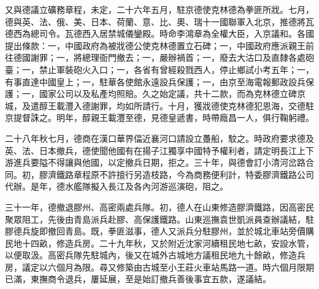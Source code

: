 \begin{pinyinscope}
又與德議立礦務章程，未定，二十六年五月，駐京德使克林德為拳匪所戕。七月，德與英、法、俄、美、日本、荷蘭、意、比、奧、瑞十一國聯軍入北京，推德將瓦德西為總司令。瓦德西入居禁城儀鑾殿。時命李鴻章為全權大臣，入京議和。各國提出條款：一，中國政府為被戕德公使克林德置立石碑；一，中國政府應派親王前往德國謝罪；一，將總理衙門撤去；一，嚴辦禍首；一，廢去大沽口及直隸各處砲臺；一，禁止軍裝砲火入口；一，各省有曾經殺戮西人，停止鄉試小考五年；一，有事直達中國皇上；一，駐華各使館永遠設兵保護；一，由京至海電報郵政設兵保護；一，國家公司以及私產均照賠。久之始定議，共十二款，而為克林德立碑京城，及遣醇王載灃入德謝罪，均如所請行。十月，獲戕德使克林德犯恩海，交德駐京提督誅之。明年，醇親王載灃至德，見德皇遞書，時帶廕昌一人，俱行鞠躬禮。

二十八年秋七月，德商在漢口華界偪近襄河口請設立躉船，駮之。時政府要求德及英、法、日本撤兵，德使聞他國有在揚子江獨享中國特予權利者，請定明長江上下游進兵要隘不得讓與他國，以定撤兵日期，拒之。三十年，與德會訂小清河岔路合同。初，膠濟鐵路章程原不許擅行另造枝路，今為商務便利計，特委膠濟鐵路公司代辦。是年，德水艦隊擬入長江及各內河游巡演砲，阻之。

三十一年，德撤退膠州、高密兩處兵隊。初，德人在山東修造膠濟鐵路，因高密民聚眾阻工，先後由青島派兵赴膠、高保護鐵路。山東巡撫袁世凱派員查辦議結，駐膠德兵旋即撤回青島。既，拳匪滋事，德人又派兵分駐膠州，並於城北車站旁價購民地十四畝，修造兵房。二十九年秋，又於附近沈家河續租民地七畝，安設水管，以便取汲。高密兵隊先駐城內，後又在城外古城地方議租民地九十餘畝，修造兵房，議定以六個月為限。尋又修築由古城至小王莊火車站馬路一道。時六個月限期已滿，東撫商令退兵，屢延展，至是始訂撤兵善後事宜五款，遂議結。


\end{pinyinscope}
